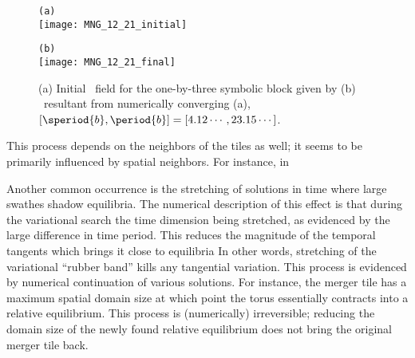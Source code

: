 \begin{itemize}
{\begin{figure}
\begin{minipage}[height=.4\textheight]{.5\textwidth}
\centering \small{\texttt{(a)}}\\
\texttt{[image: MNG\_12\_21\_initial]}
\end{minipage}
\begin{minipage}[height=.4\textheight]{.5\textwidth}
\centering \small{\texttt{(b)}}\\
\texttt{[image: MNG\_12\_21\_final]}
\end{minipage}
\caption{ \label{fig:block12_21}
(a) Initial \spt\ field for the one-by-three symbolic block given by 
(b) \twoT\ resultant from numerically converging (a),
$[\speriod{b},\period{b}]=[4.12\cdots,23.15\cdots ]$.
}
\end{figure}

This process depends on the neighbors of the tiles as well; it seems to be primarily
influenced by spatial neighbors. For instance, in




Another common occurrence is the stretching of solutions in time where large swathes shadow
equilibria. The numerical description of this effect is that during the variational search
the time dimension being stretched, as evidenced by the large difference in time
period. This reduces the magnitude of the temporal tangents which
brings it close to equilibria In other words, stretching of the
variational ``rubber band'' kills any tangential variation. This process
is evidenced by numerical continuation of various solutions. For instance,
the merger tile has a maximum spatial domain size at which point the torus
essentially contracts into a relative equilibrium. This process is (numerically) irreversible;
reducing the domain size of the newly found relative equilibrium does not
bring the original merger tile back.


}
\end{itemize}
